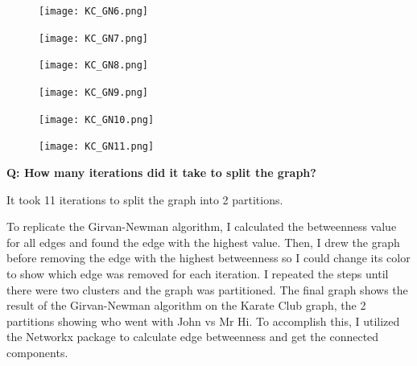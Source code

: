 \documentclass[12pt]{article}
\begin{document}
\clearpage

\begin{figure}
\centering
\begin{minipage}{.5\textwidth}
  \centering
  \texttt{[image: KC\_GN6.png]}
  \label{fig:GN6}
\end{minipage}%
\begin{minipage}{.5\textwidth}
  \centering
  \texttt{[image: KC\_GN7.png]}
  \label{fig:GN7}
\end{minipage}
\end{figure}

\begin{figure}
\centering
\begin{minipage}{.5\textwidth}
  \centering
  \texttt{[image: KC\_GN8.png]}
  \label{fig:GN8}
\end{minipage}%
\begin{minipage}{.5\textwidth}
  \centering
  \texttt{[image: KC\_GN9.png]}
  \label{fig:GN9}
\end{minipage}
\end{figure}

\begin{figure}
\centering
\begin{minipage}{.5\textwidth}
  \centering
  \texttt{[image: KC\_GN10.png]}
  \label{fig:GN10}
\end{minipage}%
\begin{minipage}{.5\textwidth}
  \centering
  \texttt{[image: KC\_GN11.png]}
  \label{fig:GN11}
\end{minipage}
\end{figure}

\clearpage

\noindent\textbf{Q: How many iterations did it take to split the graph?}

It took 11 iterations to split the graph into 2 partitions.

To replicate the Girvan-Newman algorithm, I calculated the betweenness value for all edges and found the edge with the highest value. Then, I drew the graph before removing the edge with the highest betweenness so I could change its color to show which edge was removed for each iteration. I repeated the steps until there were two clusters and the graph was partitioned. The final graph shows the result of the Girvan-Newman algorithm on the Karate Club graph, the 2 partitions showing who went with John vs Mr Hi. To accomplish this, I utilized the Networkx package to calculate edge betweenness and get the connected components.
\end{document}
